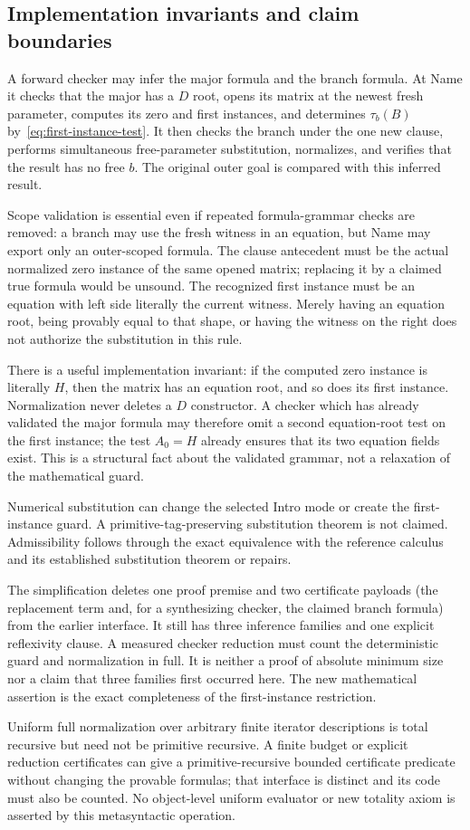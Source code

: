 \subsection{Implementation invariants and claim boundaries}

A forward checker may infer the major formula and the branch formula.
At Name it checks that the major has a $D$ root, opens its matrix at the
newest fresh parameter, computes its zero and first instances, and
determines $\tau_b(B)$ by~\eqref{eq:first-instance-test}. It then checks
the branch under the one new clause, performs simultaneous free-parameter
substitution, normalizes, and verifies that the result has no free $b$.
The original outer goal is compared with this inferred result.

Scope validation is essential even if repeated formula-grammar checks are
removed: a branch may use the fresh witness in an equation, but Name may
export only an outer-scoped formula. The clause antecedent must be the
actual normalized zero instance of the same opened matrix; replacing it
by a claimed true formula would be unsound. The recognized first instance
must be an equation with left side literally the current witness. Merely
having an equation root, being provably equal to that shape, or having the
witness on the right does not authorize the substitution in this rule.

There is a useful implementation invariant: if the computed zero instance
is literally $H$, then the matrix has an equation root, and so does its
first instance. Normalization never deletes a $D$ constructor. A checker
which has already validated the major formula may therefore omit a second
equation-root test on the first instance; the test $A_0=H$ already ensures
that its two equation fields exist. This is a structural fact about the
validated grammar, not a relaxation of the mathematical guard.

Numerical substitution can change the selected Intro mode or create the
first-instance guard. A primitive-tag-preserving substitution theorem is
not claimed. Admissibility follows through the exact equivalence with the
reference calculus and its established substitution theorem or repairs.

The simplification deletes one proof premise and two certificate payloads
(the replacement term and, for a synthesizing checker, the claimed branch
formula) from the earlier interface. It still has three inference families
and one explicit reflexivity clause. A measured checker reduction must
count the deterministic guard and normalization in full. It is neither a
proof of absolute minimum size nor a claim that three families first
occurred here. The new mathematical assertion is the exact completeness
of the first-instance restriction.

Uniform full normalization over arbitrary finite iterator descriptions is
total recursive but need not be primitive recursive. A finite budget or
explicit reduction certificates can give a primitive-recursive bounded
certificate predicate without changing the provable formulas; that
interface is distinct and its code must also be counted. No object-level
uniform evaluator or new totality axiom is asserted by this metasyntactic
operation.
